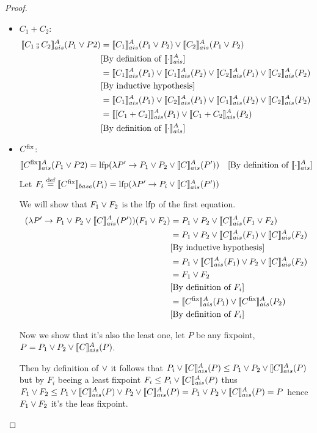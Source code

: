 \documentclass[
  10pt,       %
  twoside,    %
  a4paper,    %
  english,    %
  tikz,       %
  openright,  %
]{book}
\begin{document}
\begin{proof}
\begin{itemize}
    \item $C_1 + C_2$:
      \begin{align*}
        \asem{C_1 \fcmp C_2}(P_1 \join P2)
          &= \asem{C_1}(P_1 \join P_2) \join \asem{C_2}(P_1 \join P_2) \\
          &\text{[By definition of $\asem{\cdot}$]} \\
          &= \asem{C_1}(P_1) \join \asem{C_1}(P_2) \join \asem{C_2}(P_1)
            \join \asem{C_2}(P_2) \\
          &\text{[By inductive hypothesis]} \\
          &= \asem{C_1}(P_1) \join \asem{C_2}(P_1) \join \asem{C_1}(P_2)
            \join \asem{C_2}(P_2) \\
          &= \asem{[C_1 + C_2]}(P_1) \join \asem{C_1 + C_2}(P_2) \\
          &\text{[By definition of $\asem{\cdot}$]} \\
      \end{align*}
    \item $C^{\mathrm{fix}}$:
      \begin{align*}
        \llbracket C^{\mathrm{fix}} \rrbracket_{ais}^{A}(P_1 \lor P2)
          &= \mathrm{lfp}(\lambda P' \to P_1 \lor P_2 \lor \llbracket C \rrbracket_{ais}^{A}(P'))
          &\text{[By definition of $\llbracket \cdot \rrbracket_{ais}^{A}$]}
      \end{align*}
      Let $F_i \stackrel{\text{def}}{=} \llbracket C^{\mathrm{fix}} \rrbracket_{base}(P_i) = \mathrm{lfp}(\lambda P' \to P_i \lor 
      \llbracket C \rrbracket_{ais}^{A}(P'))$

      We will show that $F_1 \lor F_2$ is the $\mathrm{lfp}$ of the first equation.
      \begin{align*}
        (\lambda P' \to P_1 \lor P_2 \lor \llbracket C \rrbracket_{ais}^{A}(P'))(F_1 \lor F_2)
          &= P_1 \lor P_2 \lor \llbracket C \rrbracket_{ais}^{A}(F_1 \lor F_2) \\
          &= P_1 \lor P_2 \lor \llbracket C \rrbracket_{ais}^{A}(F_1) \lor \llbracket C \rrbracket_{ais}^{A}(F_2)  \\
          &\text{[By inductive hypothesis]}\\
          &= P_1 \lor \llbracket C \rrbracket_{ais}^{A}(F_1) \lor P_2 \lor \llbracket C \rrbracket_{ais}^{A}(F_2) \\
          &= F_1 \lor F_2 \\
          &\text{[By definition of $F_i$]}\\
          &= \llbracket C^{\mathrm{fix}} \rrbracket_{ais}^{A}(P_1) \lor \llbracket C^{\mathrm{fix}} \rrbracket_{ais}^{A}(P_2) \\
          &\text{[By definition of $F_i$]}\\
      \end{align*}

      Now we show that it's also the least one, let $P$ be any fixpoint, 
      $P = P_1 \lor P_2 \lor \llbracket C \rrbracket_{ais}^{A}(P)$.
      
      Then by definition of $\lor$ it follows that $P_i \lor \llbracket C \rrbracket_{ais}^{A}(P) \leq 
      P_1 \lor P_2 \lor \llbracket C \rrbracket_{ais}^{A}(P)$ but by $F_i$ beeing a least fixpoint
      $F_i \leq P_i \lor \llbracket C \rrbracket_{ais}^{A}(P)$ thus $F_1 \lor F_2 \leq P_1
      \lor \llbracket C \rrbracket_{ais}^{A}(P) \lor P_2 \lor \llbracket C \rrbracket_{ais}^{A}(P) = P_1 \lor P_2 \lor 
      \llbracket C \rrbracket_{ais}^{A}(P) = P$ hence $F_1 \lor F_2$ it's the leas fixpoint.
  \end{itemize}
\end{proof}
\end{document}
